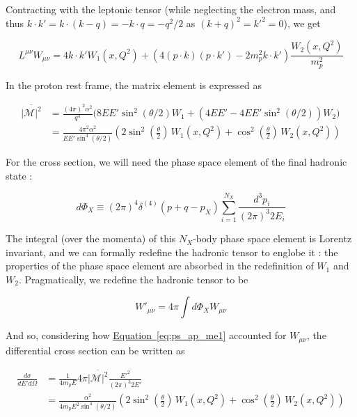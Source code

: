 \documentclass[a4paper,10pt]{report}
\newcommand{\eqlabel}{{Equation}}
\newcommand{\equref}[1]{\hyperref[#1]{\eqlabel~\ref*{#1}}}
\begin{document}
Contracting with the leptonic tensor (while neglecting the electron mass, and thus 
$k\cdot k' = k\cdot (k-q) = -k\cdot q = -q^2/2$ as $(k+q)^2 = k'^2 = 0$), we get

\begin{equation}
  L^{\mu \nu}W_{\mu \nu} = 4k\cdot k' W_1(x,Q^2) + \left(4(p\cdot k)(p\cdot k') - 2m^2_p k\cdot k'\right)\frac{W_2(x,Q^2)}{m^2_p}
\end{equation}

In the proton rest frame, the matrix element is expressed as

\begin{align}
  \overline{|\mathcal{M}|^2} &= \frac{(4\pi)^2 \alpha^2}{q^4}
  \Bigg(8EE'\sin^2(\theta/2)W_1 + \left(4EE' -4EE'\sin^2(\theta/2)\right)W_2\Bigg)\nonumber \\ 
  &= \frac{4\pi^2 \alpha^2}{EE'\sin^4(\theta/2)}\left(2\sin^2\left(\frac{\theta}{2}\right)\,W_1(x, Q^2) + \cos^2\left(\frac{\theta}{2}\right)\,W_2(x,Q^2)\right)
  \label{eq:ps_ap_me1}
\end{align}

For the cross section, we will need the phase space element of the final hadronic state : 

\begin{equation}
  d\Phi_X \equiv (2\pi)^4 \delta^{(4)}(p+q - p_X)\sum_{i=1}^{N_X}\frac{d^3p_i}{(2\pi)^3 2E_i}
\end{equation}

The integral (over the momenta) of this $N_X\text{-body}$ phase space element is Lorentz invariant, 
and we can formally redefine the hadronic tensor to englobe it : the properties of the phase space element 
are absorbed in the redefinition of $W_1$ and $W_2$. Pragmatically, we redefine the hadronic tensor to be

\begin{equation}
  W'_{\mu \nu} = 4\pi\int d\Phi_X W_{\mu \nu}
\end{equation}

And so, considering how \equref{eq:ps_ap_me1} accounted for $W_{\mu \nu}$, the 
differential cross section can be written as

\begin{align}
  \frac{d\sigma}{dE'd\Omega} &= \frac{1}{4m_pE}4\pi\overline{|\mathcal{M}|^2}\frac{E'^2}{(2\pi)^3 2E'} \nonumber \\ 
  &= \frac{\alpha^2}{4m_p E^2\sin^4(\theta/2)}\left(2\sin^2\left(\frac{\theta}{2}\right)\,W_1(x, Q^2) + \cos^2\left(\frac{\theta}{2}\right)\,W_2(x,Q^2)\right)
\end{align}
\end{document}
